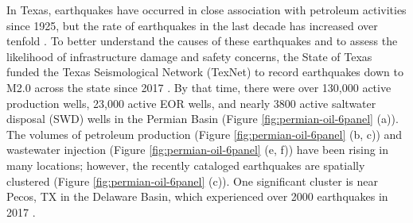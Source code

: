 






In Texas, earthquakes have occurred in close association with petroleum activities since 1925, but the rate of earthquakes in the last decade has increased over tenfold \citep{Frohlich2016HistoricalReviewInduced, Skoumal2020InducedSeismicityDelaware}.
To better understand the causes of these earthquakes and to assess the likelihood of infrastructure damage and safety concerns, 
the State of Texas funded the Texas Seismological Network (TexNet) to record earthquakes down to M2.0 across the state since 2017 \citep{Savvaidis2019TexnetStatewideSeismological}. 
By that time, there were over 130,000 active production wells, 23,000 active EOR wells, and nearly 3800 active saltwater disposal (SWD) wells in the Permian Basin (Figure \ref{fig:permian-oil-6panel} (a)).  
The volumes of petroleum production (Figure \ref{fig:permian-oil-6panel} (b, c)) and wastewater injection (Figure \ref{fig:permian-oil-6panel} (e, f)) have been rising in many locations; however, the recently cataloged earthquakes are spatially clustered (Figure \ref{fig:permian-oil-6panel} (c)). One significant cluster is near Pecos, TX in the Delaware Basin, which experienced over 2000 earthquakes in 2017 \citep{Frohlich2019OnsetCauseIncreased}. 



